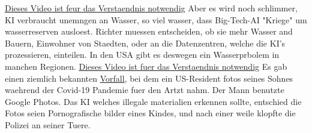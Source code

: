 \documentclass{report}
\begin{document}
\newline
\hyperlink{https://youtube.com/watch?v=5NUD7rdbCm8}{Dieses Video ist feur das Verstaendnis notwendig}
\newline
\newline
Aber es wird noch schlimmer, KI verbraucht unemngen an Wasser, so viel wasser, dass Big-Tech-AI "Kriege" um wasserreserven ausloest. Richter muessen entscheiden, ob sie mehr Wasser and Bauern, Einwohner von Staedten, oder an die Datenzentren, welche die KI's prozessieren, einteilen.
In den USA gibt es deswegen ein Wasserprbolem in manchen Regionen. 
\newline
\hyperlink{https://youtube.com/watch?v=F-6la_I-xkQ}{Dieses Video ist fuer das Verstaendnis notwendig}
\newline
\newline
Es gab einen ziemlich bekannten \hyperlink{https://www.nytimes.com/2022/08/21/technology/google-surveillance-toddler-photo.html}{Vorfall}, bei dem ein US-Resident fotos seines Sohnes waehrend der Covid-19 Pandemie fuer den Artzt nahm. Der Mann benutzte Google Photos. Das KI welches illegale materialien erkennen sollte, entschied die Fotos seien Pornografische bilder eines Kindes, und nach einer weile klopfte die Polizei an seiner Tuere.
\end{document}
